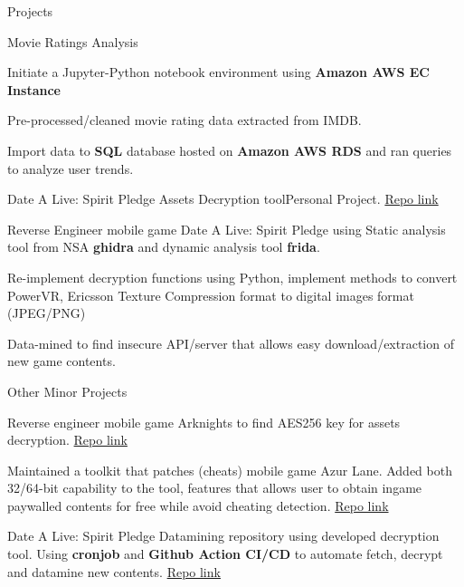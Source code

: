 \documentclass{resume} %
\begin{document}
\begin{rSection}{Projects}
    \begin{rSubsection}{Movie Ratings Analysis}{}{}{}
        \item Initiate a Jupyter-Python notebook environment using \textbf{Amazon AWS EC Instance}
        \item Pre-processed/cleaned movie rating data extracted from IMDB.
        \item Import data to \textbf{SQL} database hosted on \textbf{Amazon AWS RDS} and ran queries to analyze user trends.
    \end{rSubsection}

    \begin{rSubsection}{Date A Live: Spirit Pledge Assets Decryption tool}{}{Personal Project. \href{https://github.com/n0k0m3/DALSP-Assets-Decryption-tool}{Repo link}}{}
        \item Reverse Engineer mobile game Date A Live: Spirit Pledge using Static analysis tool from NSA \textbf{ghidra} and dynamic analysis tool \textbf{frida}.
        \item Re-implement decryption functions using Python, implement methods to convert PowerVR, Ericsson Texture Compression format to digital images format (JPEG/PNG)
        \item Data-mined to find insecure API/server that allows easy download/extraction of new game contents.
    \end{rSubsection}
    \begin{rSubsection}{Other Minor Projects}{}{}{}
        \item Reverse engineer mobile game Arknights to find AES256 key for assets decryption. \href{https://github.com/n0k0m3/Arknights-Lua-Decrypter}{Repo link}
        \item Maintained a toolkit that patches (cheats) mobile game Azur Lane. Added both 32/64-bit capability to the tool, features that allows user to obtain ingame paywalled contents for free while avoid cheating detection. \href{https://github.com/n0k0m3/Azur-Lane-Scripts-Autopatcher}{Repo link}
        \item Date A Live: Spirit Pledge Datamining repository using developed decryption tool. Using \textbf{cronjob} and \textbf{Github Action CI/CD} to automate fetch, decrypt and datamine new contents. \href{https://github.com/n0k0m3/DateALiveData}{Repo link}
    \end{rSubsection}

\end{rSection}

\end{document}
